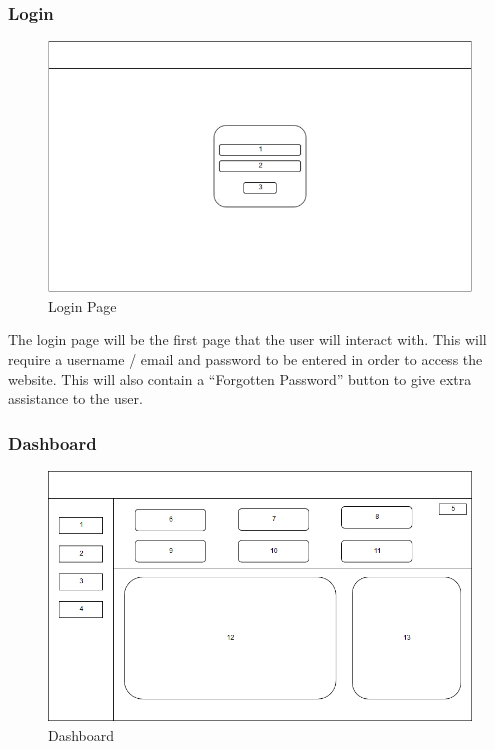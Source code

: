\documentclass[
  english,
  a4paper,
,tablecaptionabove
]{scrartcl}
\begin{document}
\hypertarget{login}{%
\subsubsection{Login}\label{login}}

\begin{figure}
\centering
\includegraphics{images/ppm-images/login-design.png}
\caption{Login Page}
\end{figure}

The login page will be the first page that the user will interact with.
This will require a username / email and password to be entered in order
to access the website. This will also contain a \enquote{Forgotten
Password} button to give extra assistance to the user.

\newpage

\hypertarget{dashboard}{%
\subsubsection{Dashboard}\label{dashboard}}

\begin{figure}
\centering
\includegraphics{images/ppm-images/dashboard-design.png}
\caption{Dashboard}
\end{figure}
\end{document}
